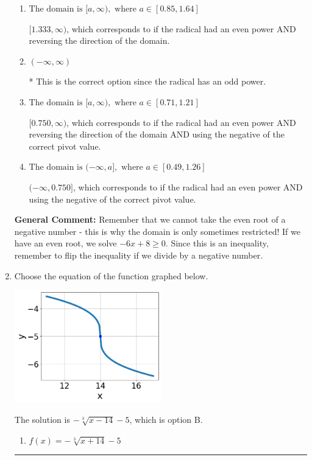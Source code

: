 \documentclass{extbook}[14pt]
\newcommand{\litem}[1]{\item #1

\rule{\textwidth}{0.4pt}}
\begin{document}
\begin{enumerate}
{\begin{enumerate}[label=\Alph*.]
$(-\infty, 1.333]$, which corresponds to if the radical had an even power.
\item \( \text{The domain is } [a, \infty), \text{   where } a \in [0.85, 1.64] \)

$[1.333, \infty)$, which corresponds to if the radical had an even power AND reversing the direction of the domain.
\item \( (-\infty, \infty) \)

* This is the correct option since the radical has an odd power.
\item \( \text{The domain is } [a, \infty), \text{   where } a \in [0.71, 1.21] \)

$[0.750, \infty)$, which corresponds to if the radical had an even power AND reversing the direction of the domain AND using the negative of the correct pivot value.
\item \( \text{The domain is } (-\infty, a], \text{   where } a \in [0.49, 1.26] \)

$(-\infty, 0.750]$, which corresponds to if the radical had an even power AND using the negative of the correct pivot value.
\end{enumerate}

\textbf{General Comment:} Remember that we cannot take the even root of a negative number - this is why the domain is only sometimes restricted! If we have an even root, we solve $-6 x + 8 \geq 0$. Since this is an inequality, remember to flip the inequality if we divide by a negative number.
}
\litem{
Choose the equation of the function graphed below.

\begin{center}
    \includegraphics[width=0.5\textwidth]{../Figures/radicalGraphToEquationCopyB.png}
\end{center}




The solution is \( - \sqrt[3]{x - 14} - 5 \), which is option B.\begin{enumerate}[label=\Alph*.]
\item \( f(x) = - \sqrt[3]{x + 14} - 5 \)


\end{enumerate}}
\end{enumerate}
\end{document}
